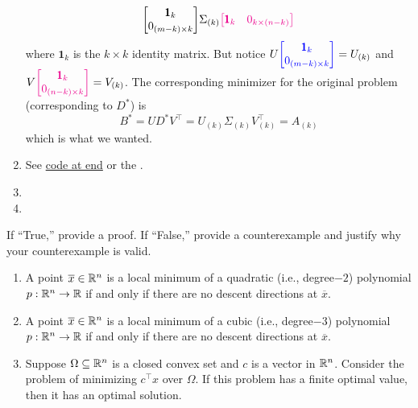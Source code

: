 \begin{enumerate}[leftmargin=*]
$${\begin{bmatrix}
\pmb 1_{k} \\0_{(m-k)\times k}
\end{bmatrix}}
\Sigma_{(k)}
{\color{magenta}\begin{bmatrix}
\pmb 1_{k} & 0_{k\times(n-k)}
\end{bmatrix}}
$$ where $\pmb 1_k$ is the $k\times k$ identity matrix. But notice $U{\color{blue}\begin{bmatrix}
\pmb 1_{k} \\0_{(m-k)\times k}
\end{bmatrix}} = U_{(k)}$ and $V{\color{magenta}\begin{bmatrix}
\pmb 1_{k} \\ 0_{(n-k)\times k}
\end{bmatrix}} = V_{(k)}$.
The corresponding minimizer for the original problem (corresponding to $D^*$) is $$B^*=UD^*V^\top = U_{(k)}\Sigma_{(k)}V_{(k)}^\top = A_{(k)}$$ which is what we wanted.
\item See \href{imgcom}{code at end} or the .

\item 

\item 

\end{enumerate}












\newpage
\pb

If ``True,” provide a proof. If ``False,” provide a counterexample and justify why your counterexample is valid.
\begin{enumerate}[leftmargin=*]
\item A point $\overline x \in \mathbb{R}^n$ is a local minimum of a quadratic (i.e., degree$-2$) polynomial $p : \mathbb{R}^n \to \mathbb{R}$ if and only if there are no descent directions at $\overline x$.
\item A point $\overline x \in \mathbb{R}^n$ is a local minimum of a cubic (i.e., degree$-3$) polynomial $p : \mathbb{R}^n \to \mathbb{R}$ if and only if there are no descent directions at $\overline x$.
\item Suppose $\Omega \subseteq \mathbb{R}^n$ is a closed convex set and $c$ is a vector in $\mathbb{R}^n$. Consider the problem of minimizing $c^\top x$ over $\Omega$. If this problem has a finite optimal value, then it has an optimal solution.
\end{enumerate}

